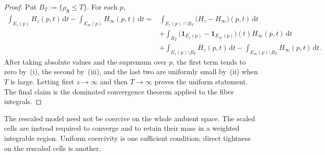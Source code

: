 \documentclass[11pt]{amsart}
\numberwithin{equation}{section}
\theoremstyle{definition}
\theoremstyle{remark}
\newcommand{\ind}{\mathbf{1}}
\newcommand{\dd}{\,\mathrm{d}}
\begin{document}
\begin{proof}
Put $B_T:=\{\rho_{\bm\beta}\le T\}$.  For each $p$,
\begin{align*}
 \int_{E_z(p)}H_z(p,t)\dd t-\int_{E_\infty(p)}H_\infty(p,t)\dd t
 ={}&\int_{E_z(p)\cap B_T}\bigl(H_z-H_\infty\bigr)(p,t)\dd t\\
 &+\int_{B_T}\bigl(\ind_{E_z(p)}-\ind_{E_\infty(p)}\bigr)(t)
 H_\infty(p,t)\dd t\\
 &+\int_{E_z(p)\setminus B_T}H_z(p,t)\dd t
 -\int_{E_\infty(p)\setminus B_T}H_\infty(p,t)\dd t.
\end{align*}
After taking absolute values and the supremum over $p$, the first term tends to
zero by~(i), the second by~(iii), and the last two are uniformly small by~(ii)
when $T$ is large.  Letting first $z\to\infty$ and then $T\to\infty$ proves the
uniform statement.  The final claim is the dominated convergence theorem
applied to the fiber integrals.
\end{proof}

The rescaled model need not be coercive on the whole ambient space.  The
scaled cells are instead required to converge and to retain their mass in a
weighted integrable region.  Uniform coercivity is one sufficient condition;
direct tightness on the rescaled cells is another.
\end{document}
